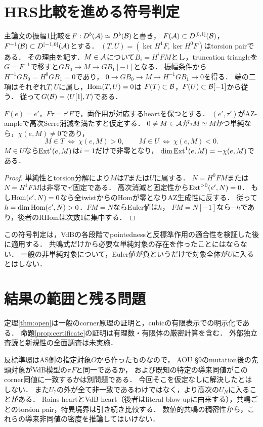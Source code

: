 \section{HRS比較を進める符号判定}
主論文\cite{Hearts}の振幅1比較を$F:D^b(\mathcal A)\simeq D^b(\mathcal B)$と書き，
$F(\mathcal A)\subset D^{[0,1]}(\mathcal B)$，$F^{-1}(\mathcal B)\subset D^{[-1,0]}(\mathcal A)$とする．
$(T,U)=(\ker H^1F,\ker H^0F)$はtorsion pairである．
その理由を記す．$M\in\mathcal A$について$B_i=H^iFM$とし，truncation triangleを
$G=F^{-1}$で移すと$GB_0\to M\to GB_1[-1]$となる．
振幅条件から$H^{-1}GB_0=H^0GB_1=0$であり，
$0\to GB_0\to M\to H^{-1}GB_1\to0$を得る．
端の二項はそれぞれ$T,U$に属し，$\operatorname{Hom}(T,U)=0$は
$F(T)\subset\mathcal B$，$F(U)\subset\mathcal B[-1]$から従う．
従って$G(\mathcal B)=\langle U[1],T\rangle$である．
\begin{proposition}\label{prop:sign}
$F(e)=e'$，$F\tau=\tau'F$で，両作用が対応するheartを保つとする．
$(e',\tau')$がAZ-ampleで高次Serre消滅を満たすと仮定する．
$0\ne M\in\mathcal A$が$\tau M\simeq M$かつ単純なら，$\chi(e,M)\ne0$であり，
\[
 M\in T\ \Longleftrightarrow\ \chi(e,M)>0,\qquad
 M\in U\ \Longleftrightarrow\ \chi(e,M)<0.
\]
$M\in U$なら$\operatorname{Ext}^i(e,M)$は$i=1$だけで非零となり，
$\dim\operatorname{Ext}^1(e,M)=-\chi(e,M)$である．
\end{proposition}
\begin{proof}
単純性とtorsion分解により$M$は$T$または$U$に属する．
$N=H^0FM$または$N=H^1FM$は非零で$\tau'$固定である．
高次消滅と固定性から$\operatorname{Ext}^{>0}(e',N)=0$．
もし$\operatorname{Hom}(e',N)=0$なら全twistからのHomが零となりAZ生成性に反する．
従って$h=\dim\operatorname{Hom}(e',N)>0$．$FM=N$ならEuler値は$h$，
$FM=N[-1]$なら$-h$であり，後者のRHomは次数1に集中する．
\end{proof}
この符号判定は，VdBの各段階でpointednessと反標準作用の適合性を検証した後に適用する．
共鳴式だけから必要な単純対象の存在を作ったことにはならない．
一般の非単純対象について，Euler値が負というだけで対象全体が$U$に入るとはしない．

\section{結果の範囲と残る問題}
定理\ref{thm:open}は一般のcorner原理の証明と，cubicの有限表示での明示化である．
命題\ref{prop:certificate}の証明は有理数・有限体の厳密計算を含む．
外部独立査読と新規性の全面調査は未実施．

反標準環はAS側の指定対象$O$から作ったものなので，
AOU \S9のmutation後の先頭対象がVdB模型の$\pi F$と同一であるか，
および既知の特定の導来同値がこのcorner同値に一致するかは別問題である．
今回そこを仮定なしに解決したとはしない．
また$U_7$の外が全て非一致であるわけではなく，より高次の$U_N$に入ることがある．
Rains heartとVdB heart（後者はliteral blow-upに由来する），共鳴ごとのtorsion pair，特異境界は引き続き比較する．
数値的共鳴の稠密性から，これらの導来非同値の密度を推論してはいけない．

